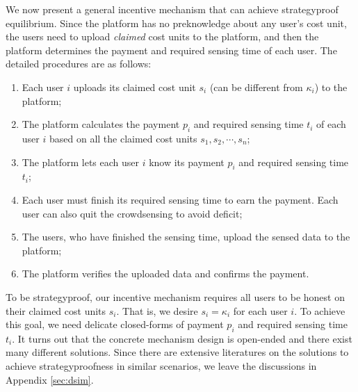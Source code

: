 \documentclass[conference]{IEEEtran}
\theoremstyle{definition}
\begin{document}
{We now present a general incentive mechanism that can achieve strategyproof equilibrium. Since the platform has no preknowledge about any user\rq{}s cost unit, the users need to upload \emph{claimed} cost units to the platform, and then the platform determines the payment and required sensing time of each user. The detailed procedures are as follows:
\begin{enumerate}
\item Each user $i$ uploads its claimed cost unit $s_i$ (can be different from $\kappa_i$) to the platform;
\item The platform calculates the payment $p_i$ and required sensing time $t_i$ of each user $i$ based on all the claimed cost units $s_1,s_2,\cdots,s_n$;
\item The platform lets each user $i$ know its payment $p_i$ and required sensing time $t_i$;
\item Each user must finish its required sensing time to earn the payment. Each user can also quit the crowdsensing to avoid deficit;
\item The users, who have finished the sensing time, upload the sensed data to the platform;
\item The platform verifies the uploaded data and confirms the payment.
\end{enumerate}
To be strategyproof, our incentive mechanism requires all users to be honest on their claimed cost units $s_i$. That is, we desire $s_i = \kappa_i$ for each user $i$. To achieve this goal, we need delicate closed-forms of payment $p_i$ and required sensing time $t_i$. It turns out that the concrete mechanism design is open-ended and there exist many different solutions. Since there are extensive literatures \cite{koutsopoulos2013optimal,luo2014profit,zhang2014free,liu2014social} on the solutions to achieve strategyproofness in similar scenarios, we leave the discussions in Appendix \ref{sec:dsim}.

}
\end{document}
